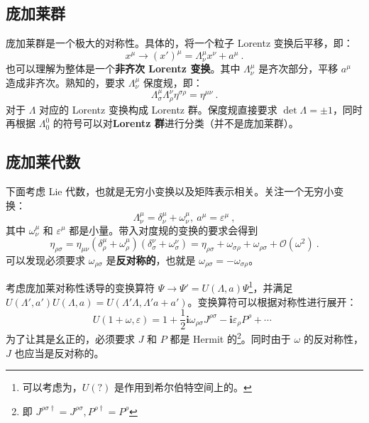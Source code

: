 
\subsection{庞加莱群}
庞加莱群是一个极大的对称性。具体的，将一个粒子 Lorentz 变换后平移，即：
\begin{equation}
	x^\mu \rightarrow (x')^\mu = \Lambda_{\nu}^\mu x^\nu + a^\mu ~.
\end{equation}
也可以理解为整体是一个\textbf{\textbf{非齐次 Lorentz 变换}}。其中 $\Lambda_{\nu}^\mu$ 是齐次部分，平移 $a^\mu$ 造成非齐次。熟知的，要求 $\Lambda_{\nu}^\mu$ 保度规，即：
\begin{equation}
	\Lambda_{\sigma}^\mu \Lambda_{\rho}^\nu \eta^{\sigma \rho} = \eta^{\mu \nu} ~.
\end{equation}
对于 $\Lambda$ 对应的 Lorentz 变换构成 Lorentz 群。保度规直接要求 $\det \Lambda = \pm 1$，同时再根据 $\Lambda^0_0$ 的符号可以对\textbf{\textbf{Lorentz 群}}进行分类（并不是庞加莱群）。

\subsection{庞加莱代数}
下面考虑 Lie 代数，也就是无穷小变换以及矩阵表示相关。关注一个无穷小变换：
\begin{equation}
	\Lambda_\nu^\mu = \delta_\nu^\mu + \omega_\nu^\mu , ~ a^\mu = \varepsilon^\mu ~,
\end{equation}
其中 $\omega^\mu_\nu$ 和 $\varepsilon^\mu$ 都是小量。带入对度规的变换的要求会得到
\begin{equation}
	\eta_{\rho\sigma} = \eta_{\mu\nu}(\delta^\mu_\rho + \omega^\mu_\rho) (\delta^\nu_\sigma + \omega^\nu_\sigma) = \eta_{\rho\sigma} + \omega_{\sigma\rho} + \omega_{\rho\sigma} + \mathcal O(\omega^2) ~.
\end{equation}
可以发现必须要求 $\omega_{\rho \sigma}$ 是\textbf{\textbf{反对称的}}，也就是 $\omega_{\rho \sigma} = -\omega_{\sigma \rho}$。

考虑庞加莱对称性诱导的变换算符 $\Psi \to \Psi' = U(\Lambda, a) \Psi$\footnote{可以考虑为，$U(?)$ 是作用到希尔伯特空间上的。}，并满足 $U(\Lambda', a') U(\Lambda, a) = U(\Lambda' \Lambda, \Lambda' a + a')$。变换算符可以根据对称性进行展开：
\begin{equation}
	U(1+\omega, \varepsilon) = 1 + \frac{1}{2} \mathbf{i} \omega_{\rho \sigma} J^{\rho \sigma} - \mathbf{i} \varepsilon_\rho P^\rho + \cdots ~~
\end{equation}
为了让其是幺正的，必须要求 $J$ 和 $P$ 都是 Hermit 的\footnote{即 $J^{\rho \sigma \dagger} = J^{\rho \sigma}, P^{\rho \dagger} = P^\rho$}。同时由于 $\omega$ 的反对称性，$J$ 也应当是反对称的。

